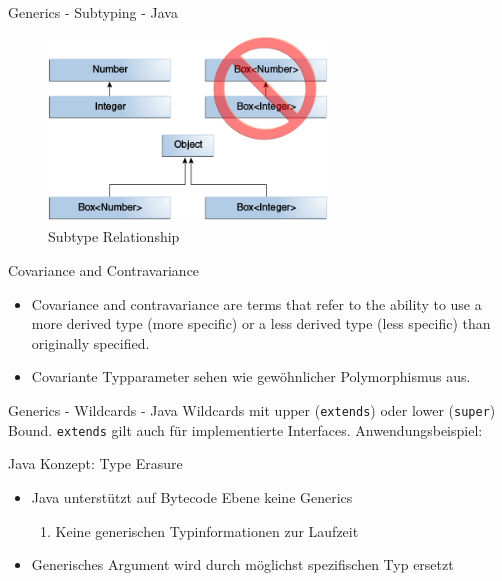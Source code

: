 \documentclass[11pt]{beamer}
\begin{document}
\begin{frame}{Generics - Subtyping - Java}
	\begin{figure}
			\includegraphics[width=0.66\textwidth]{bilder/generics-subtypeRelationship.png}
			\caption{Subtype Relationship \cite{java_generics_inheritance}}
	\end{figure}
\end{frame}

\begin{frame}{Covariance and Contravariance}
	\begin{itemize}
		\item \glqq Covariance and contravariance are terms that refer to the ability to use a more derived type (more specific) or a less derived type (less specific) than originally specified.\grqq{} \cite{csharp_docs_variance}
		\item Covariante Typparameter  sehen wie \glqq gewöhnlicher\grqq{} Polymorphismus aus.
	\end{itemize}

\end{frame}


\begin{frame}{Generics - Wildcards - Java}
		Wildcards mit upper (\texttt{extends}) oder lower (\texttt{super}) Bound. \texttt{extends} gilt auch für implementierte Interfaces.
		Anwendungsbeispiel:
\end{frame}


\begin{frame}{Java Konzept: Type Erasure}
	\begin{itemize}
	\item Java unterstützt auf Bytecode Ebene keine Generics
	\begin{enumerate}
		\item Keine generischen Typinformationen zur Laufzeit
	\end{enumerate}
	\item Generisches Argument wird durch möglichst spezifischen Typ ersetzt
	\end{itemize}
\end{frame}
\end{document}
